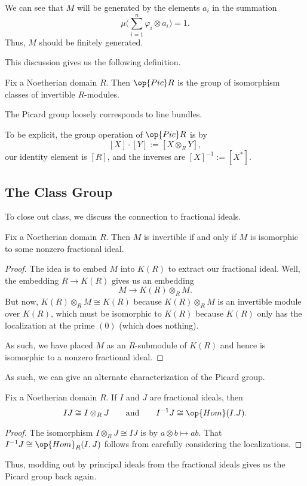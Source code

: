 \begin{remark}
	We can see that $M$ will be generated by the elements $a_i$ in the summation
	\[\mu\Bigg(\sum_{i=1}^n\varphi_i\otimes a_i\Bigg)=1.\]
	Thus, $M$ should be finitely generated.
\end{remark}
This discussion gives us the following definition.
\begin{definition}
	Fix a Noetherian domain $R$. Then $\op{Pic}R$ is the group of isomorphism classes of invertible $R$-modules.
\end{definition}
\begin{remark}
	The Picard group loosely corresponds to line bundles.
\end{remark}
To be explicit, the group operation of $\op{Pic}R$ is by
\[[X]\cdot[Y]:=[X\otimes_RY],\]
our identity element is $[R]$, and the inverses are $[X]^{-1}:=\left[X^*\right]$.

\subsection{The Class Group}
To close out class, we discuss the connection to fractional ideals.
\begin{lemma}
	Fix a Noetherian domain $R$. Then $M$ is invertible if and only if $M$ is isomorphic to some nonzero fractional ideal.
\end{lemma}
\begin{proof}
	The idea is to embed $M$ into $K(R)$ to extract our fractional ideal. Well, the embedding $R\to K(R)$ gives us an embedding
	\[M\to K(R)\otimes_RM.\]
	But now, $K(R)\otimes_RM\cong K(R)$ because $K(R)\otimes_RM$ is an invertible module over $K(R)$, which must be isomorphic to $K(R)$ because $K(R)$ only has the localization at the prime $(0)$ (which does nothing).

	As such, we have placed $M$ as an $R$-submodule of $K(R)$ and hence is isomorphic to a nonzero fractional ideal.
\end{proof}
As such, we can give an alternate characterization of the Picard group.
\begin{lemma}
	Fix a Noetherian domain $R$. If $I$ and $J$ are fractional ideals, then
	\[IJ\cong I\otimes_RJ\qquad\text{and}\qquad I^{-1}J\cong\op{Hom}(I.J).\]
\end{lemma}
\begin{proof}
	The isomorphism $I\otimes_RJ\cong IJ$ is by $a\otimes b\mapsto ab$. That $I^{-1}J\cong\op{Hom}_R(I,J)$ follows from carefully considering the localizations.
\end{proof}
Thus, modding out by principal ideals from the fractional ideals gives us the Picard group back again.